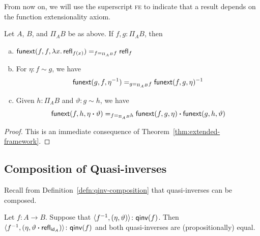\begin{ntn}
    From now on, we will use the superscript {\upshape\textsc{fe}} to indicate that a result depends on the function extensionality axiom.
\end{ntn}

\begin{prop}\label{prop:funext-functoriality}\fe
    Let\/ $A$,\/ $B$, and\/ $\Pi_AB$ be as above. If\/ $f, g\colon\Pi_AB$, then
    \begin{enumerate}[a),font=\upshape]
        \item $\mathsf{funext}(f,f,\lambda x.\,\mathsf{refl}_{f(x)})\mathrel{=_{f\mathrel{=_{\Pi_AB}} f}}\mathsf{refl}_f$

        \item For\/ $\eta\colon f\sim g$, we have
        \[
            \mathsf{funext}(g,f,\eta^{-1})\mathrel{=_{g\mathrel{=_{\Pi_AB}} f}}
            \mathsf{funext}(f,g,\eta)^{-1}
        \]

        \item Given\/ $h\colon\Pi_AB$ and\/ $\vartheta\colon g\sim h$, we have
        \[
            \mathsf{funext}(f,h,\eta\mathbin{\boldsymbol{\cdot}}\vartheta)\mathrel{=_{f\mathrel{=_{\Pi_AB}} h}}\mathsf{funext}(f,g,\eta)\mathbin{\boldsymbol{\cdot}}\mathsf{funext}(g,h,\vartheta)
        \]
    \end{enumerate}
\end{prop}

\begin{proof}
    This is an immediate consequence of Theorem~\ref{thm:extended-framework}.
\end{proof}

\subsection*{Composition of Quasi-inverses}

Recall from Definition~\ref{defn:qinv-composition} that quasi-inverses can be composed.

\begin{prop}\fe
    Let\/ $f\colon A\to B$. Suppose that\/ $\dep{f^{-1},(\eta,\vartheta)}\colon\fun{qinv}(f)$. Then\/ $\dep{f^{-1},(\eta,\vartheta\ct\fun{refl}_{\id_A})}\colon\fun{qinv}(f)$ and both quasi-inverses are (propositionally) equal.
\end{prop}

